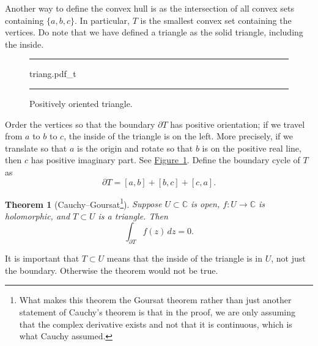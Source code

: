 \documentclass[12pt,openany]{book}
\newcommand{\C}{{\mathbb{C}}}
\theoremstyle{plain}
\newtheorem{thm}{Theorem}[section]
\theoremstyle{remark}
\theoremstyle{definition}
\newenvironment{myfig}{%
\begin{figure}[h!t]
\noindent\rule{\textwidth}{0.5pt}\vspace{12pt}\par\centering}%
{\par\noindent\rule{\textwidth}{0.5pt}
\end{figure}}
\theoremstyle{exercise}
\theoremstyle{example}
\newcommand{\figureref}[1]{\hyperref[#1]{Figure~\ref*{#1}}}
\begin{document}
Another way to define
the convex hull is as the intersection of all convex sets containing $\{ a,b,c \}$.
In particular, $T$ is the smallest convex set containing the vertices.
Do note that we have defined a triangle as the solid triangle, including
the inside.

\begin{myfig}
{triang.pdf_t}
\caption{Positively oriented triangle.%
\label{fig:triang}}
\end{myfig}
Order the vertices so that the boundary $\partial T$ has positive orientation;
if we travel from $a$ to $b$ to $c$, the inside of the triangle 
is on the left.  More precisely, if we translate so that $a$ is
the origin and rotate so that $b$ is on the positive real line, then $c$
has positive imaginary part.  See \figureref{fig:triang}.  Define the boundary cycle
of $T$ as
\begin{equation*}
\partial T = [a,b] + [b,c] + [c,a] .
\end{equation*}

\begin{thm}[Cauchy--Goursat\footnote{%
What makes this theorem the Goursat theorem
rather than just another statement of Cauchy's theorem
is that in the proof, we are only assuming that the complex derivative exists
and not that it is continuous, which is what Cauchy
assumed.}]\label{thm:cauchygoursat}
\pagebreak[2]
Suppose $U \subset \C$ is open, $f \colon U \to \C$ is
holomorphic,
and $T \subset U$ is a triangle.  Then
\begin{equation*}
\int_{\partial T} f(z) \, dz = 0 .
\end{equation*}
\end{thm}

It is important that $T \subset U$ means that the inside
of the triangle is in $U$, not just the boundary.  Otherwise the theorem
would not be true.
\end{document}
